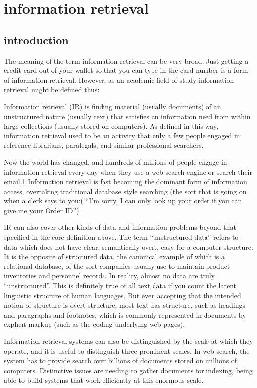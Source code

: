 \section{information retrieval}  

\subsection{introduction}


The meaning of the term information retrieval can be very broad. Just getting a credit card out of your wallet so that you can type in the card number is a form of information retrieval. However, as an academic field of study information retrieval might be defined thus: 

Information retrieval (IR) is finding material (usually documents) of an unstructured nature (usually text) that satisfies an information need from within large collections (usually stored on computers). As defined in this way, information retrieval used to be an activity that only a few people engaged in: reference librarians, paralegals, and similar professional searchers.

Now the world has changed, and hundreds of millions of people engage in information retrieval every day when they use a web search engine or search their email.1 Information retrieval is fast becoming the dominant form of information access, overtaking traditional database style searching (the sort that is going on when a clerk says to you:( “I’m sorry, I can only look up your order if you can give me your Order ID”).
 
IR can also cover other kinds of data and information problems beyond that specified in the core definition above. The term “unstructured data” refers to data which does not have clear, semantically overt, easy-for-a-computer structure. It is the opposite of structured data, the canonical example of which is a relational database, of the sort companies usually use to maintain product inventories and personnel records. In reality, almost no data are truly “unstructured”. This is definitely true of all text data if you count the latent linguistic structure of human languages. But even accepting that the intended notion of structure is overt structure, most text has structure, such as headings and paragraphs and footnotes, which is commonly represented in documents by explicit markup (such as the coding underlying web pages).

Information retrieval systems can also be distinguished by the scale at
which they operate, and it is useful to distinguish three prominent scales.
In web search, the system has to provide search over billions of documents
stored on millions of computers. Distinctive issues are needing to gather
documents for indexing, being able to build systems that work efficiently
at this enormous scale.




